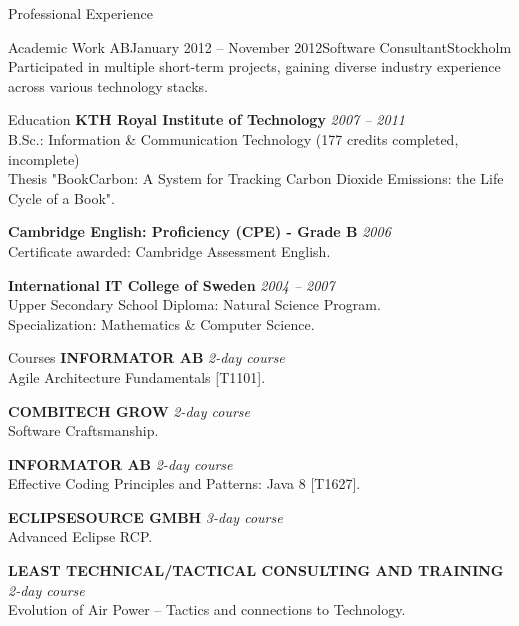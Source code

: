 \documentclass{resume}
\begin{document}
\begin{rSection}{Professional Experience}
\begin{rSubsection}{Academic Work AB}{January 2012 -- November 2012}{Software Consultant}{Stockholm}
\bItem Participated in multiple short-term projects, gaining diverse industry experience across various technology stacks.
\end{rSubsection}
\end{rSection}

\begin{rSection}{Education}
{\bf KTH Royal Institute of Technology}
\hfill {\em 2007 -- 2011 } \\
{ B.Sc.: Information \& Communication Technology (177 credits completed, incomplete) } \\
{ Thesis "BookCarbon: A System for Tracking Carbon Dioxide Emissions: the Life Cycle of a Book". }

{\bf Cambridge English: Proficiency (CPE) - Grade B}
\hfill {\em 2006 } \\
{ Certificate awarded: Cambridge Assessment English. }

{\bf International IT College of Sweden}
\hfill {\em 2004 -- 2007 } \\
{ Upper Secondary School Diploma: Natural Science Program. } \\
{ Specialization: Mathematics \& Computer Science. }
\end{rSection}

\begin{rSection}{Courses}
{\bf INFORMATOR AB}
\hfill {\em 2-day course } \\
{ Agile Architecture Fundamentals [T1101]. } %

{\bf COMBITECH GROW}
\hfill {\em 2-day course } \\
{ Software Craftsmanship. } %

{\bf INFORMATOR AB}
\hfill {\em 2-day course } \\
{ Effective Coding Principles and Patterns: Java 8 [T1627]. } %

{\bf ECLIPSESOURCE GMBH}
\hfill {\em 3-day course } \\
{ Advanced Eclipse RCP. } %

{\bf LEAST TECHNICAL/TACTICAL CONSULTING AND TRAINING}
\hfill {\em 2-day course } \\
{ Evolution of Air Power – Tactics and connections to Technology. } %
\end{rSection}
\end{document}
